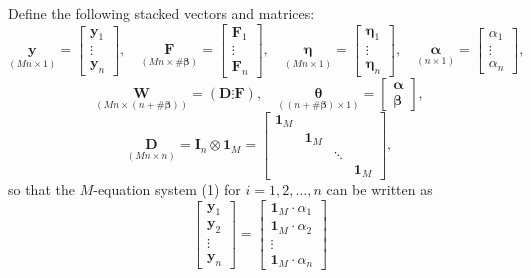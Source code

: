 \begin{problemset}
Define the following stacked vectors and matrices:
\[
  \underset{(Mn \times 1)}{\mathbf{y}} = \begin{bmatrix} \mathbf{y}_1 \\ \vdots \\ \mathbf{y}_n \end{bmatrix}, \quad
  \underset{(Mn \times \#\boldsymbol{\beta})}{\mathbf{F}} = \begin{bmatrix} \mathbf{F}_1 \\ \vdots \\ \mathbf{F}_n \end{bmatrix}, \quad
  \underset{(Mn \times 1)}{\boldsymbol{\eta}} = \begin{bmatrix} \boldsymbol{\eta}_1 \\ \vdots \\ \boldsymbol{\eta}_n \end{bmatrix}, \quad
  \underset{(n \times 1)}{\boldsymbol{\alpha}} = \begin{bmatrix} \alpha_1 \\ \vdots \\ \alpha_n \end{bmatrix},
\]
\[
  \underset{(Mn \times (n + \#\boldsymbol{\beta}))}{\mathbf{W}} = (\mathbf{D} \vdots \mathbf{F}), \quad
  \underset{((n + \#\boldsymbol{\beta}) \times 1)}{\boldsymbol{\theta}}
  = \begin{bmatrix} \boldsymbol{\alpha} \\ \boldsymbol{\beta} \end{bmatrix},
\]
\begin{equation}
  \underset{(Mn \times n)}{\mathbf{D}} = \mathbf{I}_n \otimes \mathbf{1}_M
  = \begin{bmatrix}
    \mathbf{1}_M & & \\
    & \mathbf{1}_M & \\
    & & \ddots \\
    & & & \mathbf{1}_M
  \end{bmatrix}, \tag{2}
\end{equation}
so that the $M$-equation system (1) for $i = 1, 2, \ldots, n$ can be written as
\[
  \begin{bmatrix} \mathbf{y}_1 \\ \mathbf{y}_2 \\ \vdots \\ \mathbf{y}_n \end{bmatrix}
  = \begin{bmatrix} \mathbf{1}_M \cdot \alpha_1 \\ \mathbf{1}_M \cdot \alpha_2 \\ \vdots \\ \mathbf{1}_M \cdot \alpha_n \end{bmatrix}
\]
\end{problemset}
